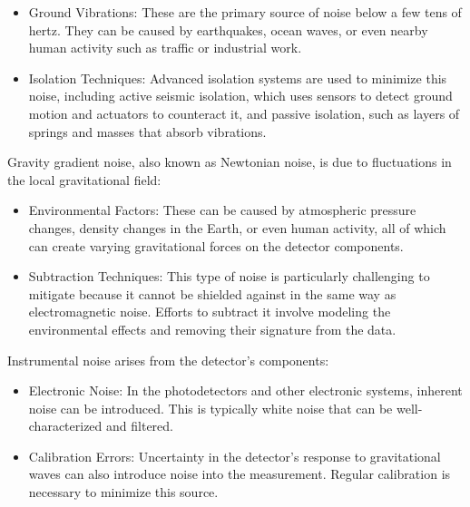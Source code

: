 \begin{itemize}
    \item Ground Vibrations: These are the primary source of noise below a few tens of hertz. They can be caused by earthquakes, ocean waves, or even nearby human activity such as traffic or industrial work.
    \item Isolation Techniques: Advanced isolation systems are used to minimize this noise, including active seismic isolation, which uses sensors to detect ground motion and actuators to counteract it, and passive isolation, such as layers of springs and masses that absorb vibrations.
\end{itemize}

Gravity gradient noise, also known as Newtonian noise, is due to fluctuations in the local gravitational field:
\begin{itemize}
    \item  Environmental Factors: These can be caused by atmospheric pressure changes, density changes in the Earth, or even human activity, all of which can create varying gravitational forces on the detector components.
    \item Subtraction Techniques: This type of noise is particularly challenging to mitigate because it cannot be shielded against in the same way as electromagnetic noise. Efforts to subtract it involve modeling the environmental effects and removing their signature from the data.
\end{itemize}

Instrumental noise arises from the detector's components:
\begin{itemize}
    \item  Electronic Noise: In the photodetectors and other electronic systems, inherent noise can be introduced. This is typically white noise that can be well-characterized and filtered.
    \item Calibration Errors: Uncertainty in the detector's response to gravitational waves can also introduce noise into the measurement. Regular calibration is necessary to minimize this source.
\end{itemize}

